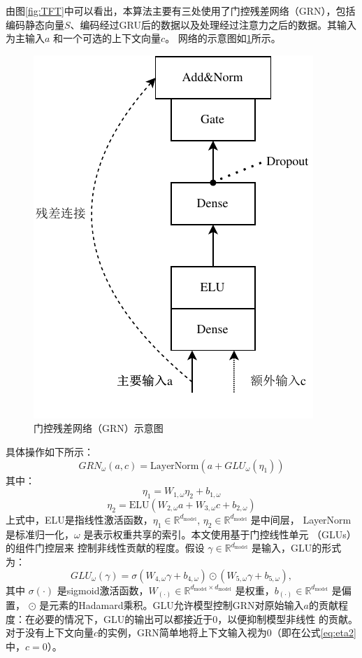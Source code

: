 由图\ref{fig:TFT}中可以看出，本算法主要有三处使用了门控残差网络（GRN），包括编码静态向量$S$、编码经过GRU后的数据以及处理经过注意力之后的数据。其输入为主输入${a}$
和一个可选的上下文向量${c}$。
网络的示意图如\ref{fig:GRN}所示。
\begin{figure}[H]
    \centering
    \includegraphics{figure/残差连接.vision.pdf}
    \caption{门控残差网络（GRN）示意图}
    \label{fig:GRN}
\end{figure}
具体操作如下所示：
\begin{equation}
    GRN_{\omega}({a}, {c}) = \text{LayerNorm}({a} + GLU_{\omega}({\eta}_1))
\end{equation}
其中：
\begin{equation}
    {\eta}_1 = {W}_{1,\omega} {\eta}_2 + {b}_{1,\omega}
\end{equation}
\begin{equation}
    {\eta}_2 = \text{ELU}({W}_{2,\omega} {a} + {W}_{3,\omega} {c} + {b}_{2,\omega})
    \label{eq:eta2}
\end{equation}
上式中，ELU是指线性激活函数，$\eta_1 \in \mathbb{R}^{d_{\text{model}}}$, $\eta_2 \in \mathbb{R}^{d_{\text{model}}}$ 是中间层，
LayerNorm是标准归一化，$\omega$ 是表示权重共享的索引。本文使用基于门控线性单元 （GLUs）的组件门控层来
控制非线性贡献的程度。假设 ${\gamma } \in \mathbb{R}^{d_{\text{model}}}$ 是输入，GLU的形式为：
\begin{equation}
    GLU_{\omega}({\gamma }) = \sigma({W}_{4,\omega} {{\gamma }} + {b}_{4,\omega}) \odot ({W}_{5,\omega} {{\gamma }} + {b}_{5,\omega}),
\end{equation}
其中 $\sigma(\cdot)$ 是sigmoid激活函数，${W}_{(\cdot)} \in \mathbb{R}^{d_{\text{model}} \times d_{\text{model}}}$ 是权重，${b}_{(\cdot)} \in \mathbb{R}^{d_{\text{model}}}$ 是偏置，
$\odot $ 是元素的Hadamard乘积。GLU允许模型控制GRN对原始输入${a}$的贡献程度：在必要的情况下，GLU的输出可以都接近于0，以便抑制模型非线性
的贡献。对于没有上下文向量${c}$的实例，GRN简单地将上下文输入视为0（即在公式\eqref{eq:eta2}中，${c}=0$）。

